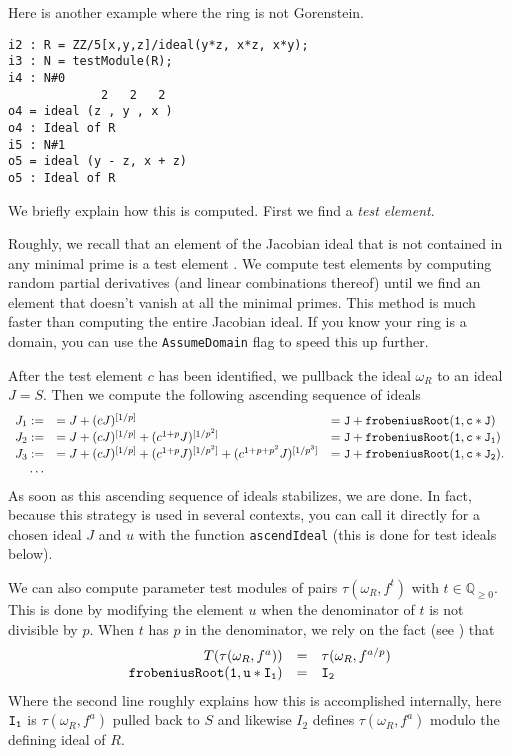 \documentclass[11pt]{amsart}
\begin{document}
Here is another example where the ring is not Gorenstein.
\begin{verbatim}
i2 : R = ZZ/5[x,y,z]/ideal(y*z, x*z, x*y);
i3 : N = testModule(R);
i4 : N#0
             2   2   2
o4 = ideal (z , y , x )
o4 : Ideal of R
i5 : N#1
o5 = ideal (y - z, x + z)
o5 : Ideal of R
\end{verbatim}

We briefly explain how this is computed.  First we find a \emph{test element}.
\begin{remark}
\label{rem.ComputationOfTestElements}
Roughly, we recall that an element of the Jacobian ideal that is not contained in any minimal prime is a test element \cite{}.  We compute test elements by computing random partial derivatives (and linear combinations thereof) until we find an element that doesn't vanish at all the minimal primes.  This method is much faster than computing the entire Jacobian ideal.  If you know your ring is a domain, you can use the {\tt AssumeDomain} flag to speed this up further.
\end{remark}

After the test element $c$ has been identified, we pullback the ideal $\omega_R$ to an ideal $J = S$.  Then we compute the following ascending sequence of ideals
\begin{equation}
\label{eq.AscendIdealExplanation}
\begin{array}{rll}
J_1 := & = J + (c J)^{[1/p]} & = {\tt J + frobeniusRoot(1, c*J)}\\
J_2 := & = J + (c J)^{[1/p]} + (c^{1+p} J)^{[1/p^2]} & = {\tt J + frobeniusRoot(1, c*J_1)}\\
J_3 := & = J + (c J)^{[1/p]} + (c^{1+p} J)^{[1/p^2]} + (c^{1+p+p^2} J)^{[1/p^3]} & = {\tt J + frobeniusRoot(1, c*J_2)}.\\
\dots
\end{array}
\end{equation}
As soon as this ascending sequence of ideals stabilizes, we are done.
In fact, because this strategy is used in several contexts, you can call it directly for a chosen ideal $J$ and $u$ with the function {\tt ascendIdeal} (this is done for test ideals below).

We can also compute parameter test modules of pairs $\tau(\omega_R, f^{t})$ with $t \in \mathbb{Q}_{\geq 0}$.  This is done by modifying the element $u$ when the denominator of $t$ is not divisible by $p$.  When $t$ has $p$ in the denominator, we rely on the fact (see \cite{}) that
\[
\begin{array}{rcl}
T(\tau(\omega_R, f^a)) & = & \tau(\omega_R, f^{a/p})\\
{\tt frobeniusRoot(1, u*I_1)} & {\tt =} & {\tt I_2}
\end{array}
\]
Where the second line roughly explains how this is accomplished internally, here ${\tt I_1}$ is $\tau(\omega_R, f^a)$ pulled back to $S$ and likewise $I_2$ defines $\tau(\omega_R, f^a)$ modulo the defining ideal of $R$.
\end{document}
